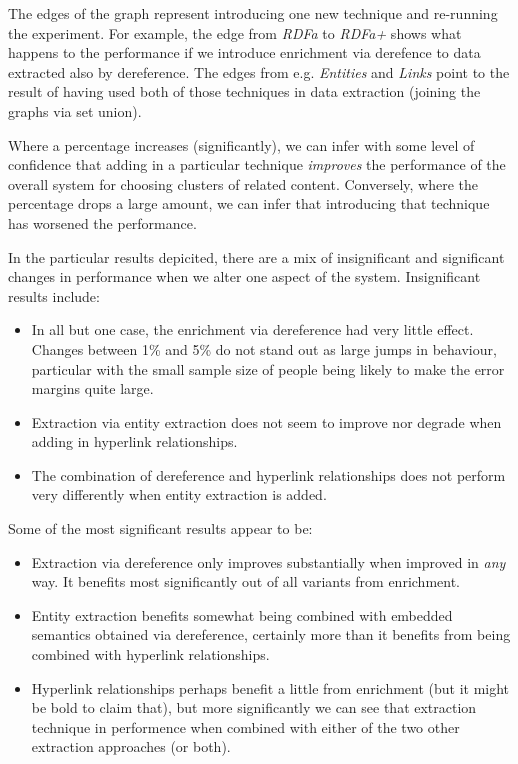 The edges of the graph represent introducing one new technique and
re-running the experiment. For example, the edge from \emph{RDFa} to
\emph{RDFa+} shows what happens to the performance if we introduce
enrichment via derefence to data extracted also by dereference.
The edges from e.g. \emph{Entities} and \emph{Links} point to
the result of having used both of those techniques in data extraction
(joining the graphs via set union).

Where a percentage increases (significantly), we can infer with some
level of confidence that adding in a particular technique
\emph{improves} the performance of the overall system for choosing
clusters of related content. Conversely, where the percentage drops
a large amount, we can infer that introducing that technique has
worsened the performance.

In the particular results depicited, there are a mix of insignificant
and significant changes in performance when we alter one aspect of
the system. Insignificant results include:

\begin{itemize}
\item In all but one case, the enrichment via dereference had
  very little effect. Changes between 1\% and 5\% do not stand out
  as large jumps in behaviour, particular with the small sample size
  of people being likely to make the error margins quite large.
\item Extraction via entity extraction does not seem to improve nor
  degrade when adding in hyperlink relationships.
\item The combination of dereference and hyperlink relationships
  does not perform very differently when entity extraction is added.
\end{itemize}

Some of the most significant results appear to be:

\begin{itemize}
\item Extraction via dereference only improves substantially when
  improved in \emph{any} way. It benefits most significantly out of
  all variants from enrichment.
\item Entity extraction benefits somewhat being combined with
  embedded semantics obtained via dereference, certainly more than
  it benefits from being combined with hyperlink relationships.
\item Hyperlink relationships perhaps benefit a little from
  enrichment (but it might be bold to claim that), but more significantly
  we can see that extraction technique in performence when combined
  with either of the two other extraction approaches (or both).
\end{itemize}

